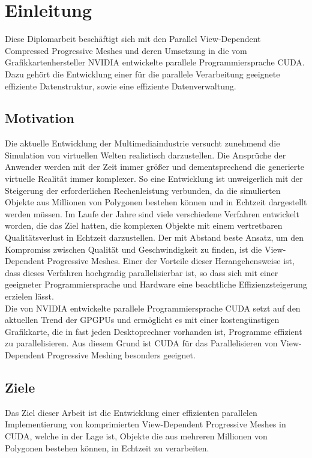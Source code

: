 \chapter{Einleitung}
Diese Diplomarbeit beschäftigt sich mit den Parallel View-Dependent Compressed Progressive Meshes und deren Umsetzung in die vom Grafikkartenhersteller NVIDIA entwickelte parallele Programmiersprache CUDA. Dazu gehört die Entwicklung einer für die parallele Verarbeitung geeignete effiziente Datenstruktur, sowie eine effiziente Datenverwaltung.  

\section{Motivation}
Die aktuelle Entwicklung der Multimediaindustrie versucht zunehmend die Simulation von virtuellen Welten realistisch darzustellen. Die Ansprüche der Anwender werden mit der Zeit immer größer und dementsprechend die generierte virtuelle Realität immer komplexer. So eine Entwicklung ist unweigerlich mit der  Steigerung der erforderlichen Rechenleistung verbunden, da die simulierten Objekte aus  Millionen von Polygonen bestehen können und  in Echtzeit dargestellt werden müssen.
Im Laufe der Jahre sind viele verschiedene Verfahren entwickelt worden, die das Ziel hatten, die komplexen Objekte mit einem vertretbaren Qualitätsverlust in Echtzeit darzustellen. Der mit Abstand beste Ansatz, um den Kompromiss zwischen Qualität und Geschwindigkeit zu finden, ist die View-Dependent Progressive Meshes. Einer der Vorteile dieser Herangehensweise ist, dass dieses Verfahren hochgradig parallelisierbar ist, so dass sich mit einer geeigneter Programmiersprache und Hardware eine beachtliche Effizienzsteigerung erzielen lässt.\\
Die von NVIDIA entwickelte parallele Programmiersprache CUDA setzt auf den aktuellen Trend der GPGPUs und  ermöglicht es mit einer kostengünstigen Grafikkarte, die in fast jeden Desktoprechner vorhanden ist, Programme effizient zu parallelisieren. Aus diesem Grund ist CUDA für das Parallelisieren von View-Dependent Progressive Meshing besonders geeignet.

\section{Ziele}\label{chp:Ziele}   
Das Ziel dieser Arbeit ist die Entwicklung einer effizienten parallelen Implementierung  von komprimierten View-Dependent Progressive Meshes in CUDA, welche in der Lage ist, Objekte die aus mehreren Millionen von Polygonen bestehen können, in Echtzeit zu verarbeiten.

